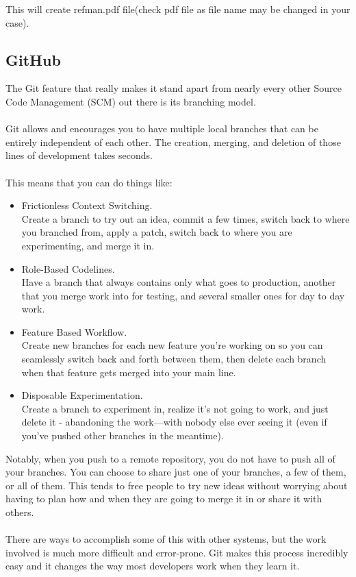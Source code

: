 This will create refman.pdf file(check pdf file as file name may be
changed in your case).
\newpage
{}
\newpage
{}

\newpage
\subsection{GitHub}

The Git feature that really makes it stand apart from nearly every
other Source Code Management (SCM) out there is its branching model.\\
\\
Git allows and encourages you to have multiple local branches that can
be entirely independent of each other. The creation, merging, and
deletion of those lines of development takes seconds.\\ \\
This means that you can do things like:
\begin{itemize}
\item Frictionless Context Switching.\\ Create a branch to try out an
idea, commit a few times, switch back to where you branched from,
apply a patch, switch back to where you are experimenting, and merge
it in.
\item Role-Based Codelines. \\ Have a branch that always contains only
what goes to production, another that you merge work into for testing,
and several smaller ones for day to day work.
\item Feature Based Workflow. \\ Create new branches for each new
feature you're working on so you can seamlessly switch back and forth
between them, then delete each branch when that feature gets merged
into your main line.
\item Disposable Experimentation.\\  Create a branch to experiment in,
realize it's not going to work, and just delete it - abandoning the
work—with nobody else ever seeing it (even if you've pushed other
branches in the meantime).
\end{itemize}
Notably, when you push to a remote repository, you do not have to push
all of your branches. You can choose to share just one of your
branches, a few of them, or all of them. This tends to free people to
try new ideas without worrying about having to plan how and when they
are going to merge it in or share it with others.\\ \\
There are ways to accomplish some of this with other systems, but the
work involved is much more difficult and error-prone. Git makes this
process incredibly easy and it changes the way most developers work
when they learn it.
